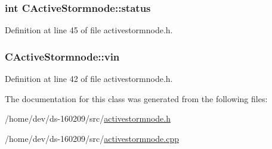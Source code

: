 \subsubsection[{status}]{\setlength{\rightskip}{0pt plus 5cm}int C\+Active\+Stormnode\+::status}\label{class_c_active_stormnode_a8ab0534b87cbee04dfae4eff95d83786}


Definition at line 45 of file activestormnode.\+h.

\hypertarget{class_c_active_stormnode_aef2103b9e7fdc173e56dbb8f903e1f38}{}
\subsubsection[{vin}]{ C\+Active\+Stormnode\+::vin}\label{class_c_active_stormnode_aef2103b9e7fdc173e56dbb8f903e1f38}


Definition at line 42 of file activestormnode.\+h.



The documentation for this class was generated from the following files\+:\begin{DoxyCompactItemize}
\item 
/home/dev/ds-\/160209/src/\hyperlink{activestormnode_8h}{activestormnode.\+h}\item 
/home/dev/ds-\/160209/src/\hyperlink{activestormnode_8cpp}{activestormnode.\+cpp}\end{DoxyCompactItemize}
